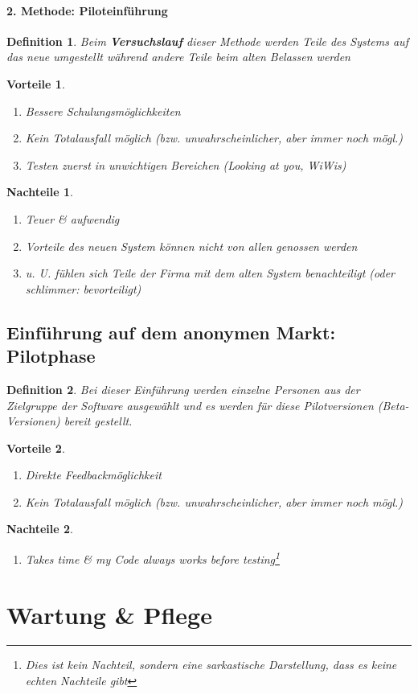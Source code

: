 \documentclass[a4paper]{article}
\theoremstyle{break}
\newtheorem{defi}{Definition}[section]
\newtheorem{why}{Vorteile}[section]
\newtheorem{whynot}{Nachteile}[section]
\begin{document}
\paragraph{2. Methode: Piloteinführung}
\begin{defi}
	Beim \textbf{Versuchslauf} dieser Methode werden Teile des Systems auf das neue umgestellt während andere Teile beim alten Belassen werden
\end{defi}
\begin{why}
	\begin{enumerate}
		\item Bessere Schulungsmöglichkeiten
		\item Kein Totalausfall möglich (bzw. unwahrscheinlicher, aber immer noch mögl.)
		\item Testen zuerst in unwichtigen Bereichen (Looking at you, WiWis)
	\end{enumerate}
\end{why}
\begin{whynot}
	\begin{enumerate}
		\item Teuer \& aufwendig
		\item Vorteile des neuen System können nicht von allen genossen werden
		\item u. U. fühlen sich Teile der Firma mit dem alten System benachteiligt (oder schlimmer: bevorteiligt)
	\end{enumerate}
\end{whynot}
\subsection{Einführung auf dem anonymen Markt: Pilotphase}
\begin{defi}
Bei dieser Einführung werden einzelne Personen aus der Zielgruppe der Software ausgewählt und es werden für diese Pilotversionen (Beta-Versionen) bereit gestellt.
\end{defi}
\begin{why}
	\begin{enumerate}
		\item Direkte Feedbackmöglichkeit
		\item Kein Totalausfall möglich (bzw. unwahrscheinlicher, aber immer noch mögl.)
	\end{enumerate}
\end{why}
\begin{whynot}
	\begin{enumerate}
		\item Takes time \& my Code always works before testing\footnote{Dies ist kein Nachteil, sondern eine sarkastische Darstellung, dass es keine echten Nachteile gibt}
	\end{enumerate}
\end{whynot}
\section{Wartung \& Pflege}
\end{document}
